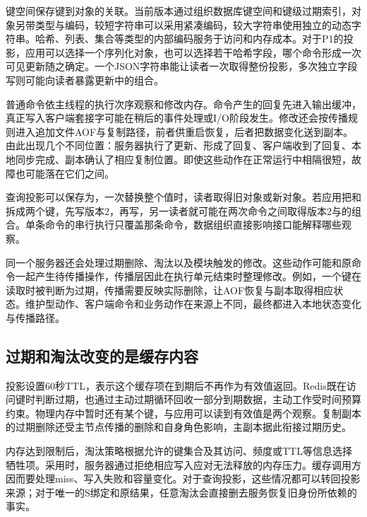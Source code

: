 键空间保存键到对象的关联。当前版本通过组织数据库键空间和键级过期索引，对象另带类型与编码，较短字符串可以采用紧凑编码，较大字符串使用独立的动态字符串。哈希、列表、集合等类型的内部编码服务于访问和内存成本。对于P1的投影，应用可以选择一个序列化对象，也可以选择若干哈希字段，哪个命令形成一次可见更新随之确定。一个JSON字符串能让读者一次取得整份投影，多次独立字段写则可能向读者暴露更新中的组合。

普通命令依主线程的执行次序观察和修改内存。命令产生的回复先进入输出缓冲，真正写入客户端套接字可能在稍后的事件处理或I/O阶段发生。修改还会按传播规则进入追加文件AOF与复制路径，前者供重启恢复，后者把数据变化送到副本。由此出现几个不同位置：服务器执行了更新、形成了回复、客户端收到了回复、本地同步完成、副本确认了相应复制位置。即使这些动作在正常运行中相隔很短，故障也可能落在它们之间。

查询投影可以保存为，一次替换整个值时，读者取得旧对象或新对象。若应用把和拆成两个键，先写版本2，再写，另一读者就可能在两次命令之间取得版本2与的组合。单条命令的串行执行只覆盖那条命令，数据组织直接影响接口能解释哪些观察。

同一个服务器还会处理过期删除、淘汰以及模块触发的修改。这些动作可能和原命令一起产生待传播操作，传播层因此在执行单元结束时整理修改。例如，一个键在读取时被判断为过期，传播需要反映实际删除，让AOF恢复与副本取得相应状态。维护型动作、客户端命令和业务动作在来源上不同，最终都进入本地状态变化与传播路径。


\subsection{过期和淘汰改变的是缓存内容}

投影设置60秒TTL，表示这个缓存项在到期后不再作为有效值返回。Redis既在访问键时判断过期，也通过主动过期循环回收一部分到期数据，主动工作受时间预算约束。物理内存中暂时还有某个键，与应用可以读到有效值是两个观察。复制副本的过期删除还受主节点传播的删除和自身角色影响，主副本据此衔接过期历史。

内存达到限制后，淘汰策略根据允许的键集合及其访问、频度或TTL等信息选择牺牲项。采用时，服务器通过拒绝相应写入应对无法释放的内存压力。缓存调用方因而要处理miss、写入失败和容量变化。对于查询投影，这些情况都可以转回投影来源；对于唯一的S绑定和原结果，任意淘汰会直接删去服务恢复旧身份所依赖的事实。

